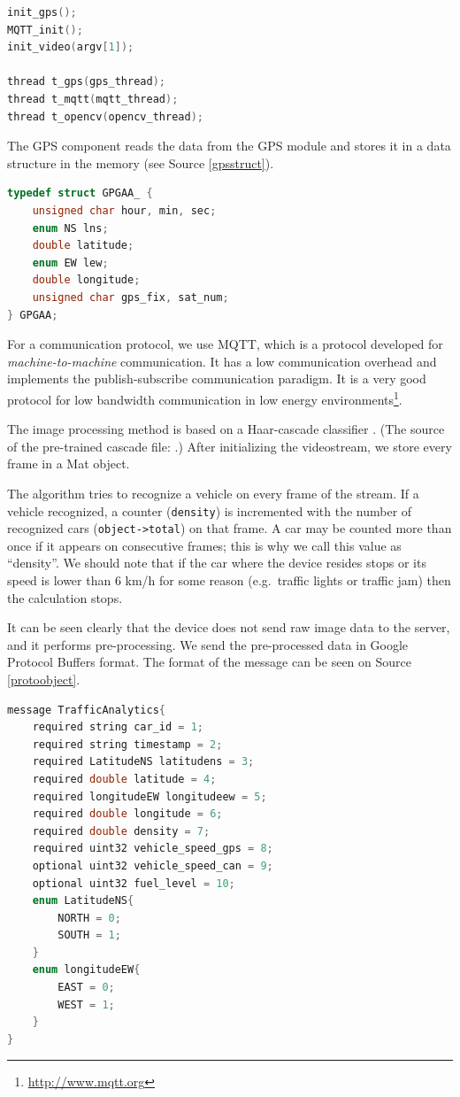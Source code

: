 \documentclass[b5paper,12pt]{report}
\theoremstyle{definition}
\begin{document}
\begin{lstlisting}[language=C++,caption=Component initialization and execution., label=main]
init_gps();
MQTT_init();
init_video(argv[1]);

thread t_gps(gps_thread);
thread t_mqtt(mqtt_thread);
thread t_opencv(opencv_thread);
\end{lstlisting}

The GPS component reads the data from the GPS module and stores it in a data structure in the memory (see Source \ref{gpsstruct}).

\begin{lstlisting}[language=C++,caption=The data structure for timing and positioning., label=gpsstruct]
typedef struct GPGAA_ {
    unsigned char hour, min, sec;
    enum NS lns;
    double latitude;
    enum EW lew;
    double longitude;
    unsigned char gps_fix, sat_num;
} GPGAA;
\end{lstlisting}

For a communication protocol, we use MQTT, which is a protocol developed for \emph{machine-to-machine} communication. It has a low communication overhead and implements the publish-subscribe communication paradigm. It is a very good protocol for low bandwidth communication in low energy environments\footnote{\url{http://www.mqtt.org}}. 

The image processing method is based on a Haar-cascade classifier \cite{violacascade} \cite{haaremp}. (The source of the pre-trained cascade file: \cite{cascade}.) After initializing the videostream, we store every frame in a Mat object.

The algorithm tries to recognize a vehicle on every frame of the stream. If a vehicle recognized, a counter (\texttt{density}) is incremented with the number of recognized cars ({\texttt{object->total}}) on that frame. A car may be counted more than once if it appears on consecutive frames; this is why we call this value as \enquote{density}. We should note that if the car where the device resides stops or its speed is lower than 6 km/h for some reason (e.g.~traffic lights or traffic jam) then the calculation stops. 

It can be seen clearly that the device does not send raw image data to the server, and it performs pre-processing. We send the pre-processed data in Google Protocol Buffers format. The format of the message can be seen on Source \ref{protoobject}.

\begin{lstlisting}[language=C,caption=Protocol Buffers message format., label=protoobject]
message TrafficAnalytics{
    required string car_id = 1;
    required string timestamp = 2;
    required LatitudeNS latitudens = 3;
    required double latitude = 4;
    required longitudeEW longitudeew = 5;
    required double longitude = 6;
    required double density = 7;
    required uint32 vehicle_speed_gps = 8;
    optional uint32 vehicle_speed_can = 9;
    optional uint32 fuel_level = 10;
    enum LatitudeNS{
        NORTH = 0;
        SOUTH = 1;
    }
    enum longitudeEW{
        EAST = 0;
        WEST = 1;
    }
}
\end{lstlisting}
\end{document}
